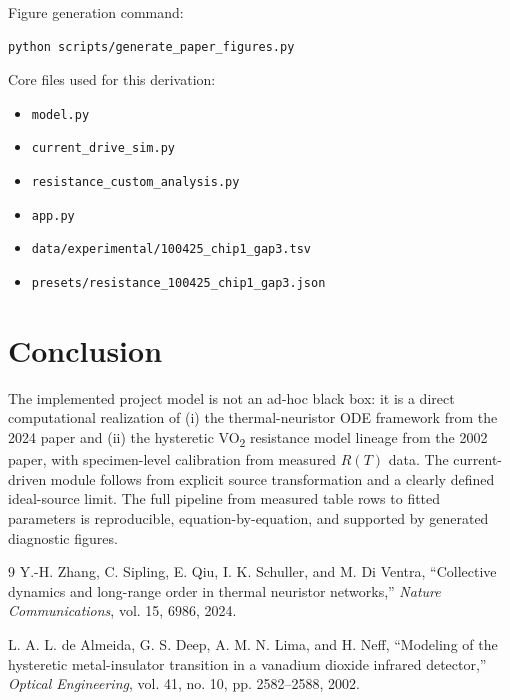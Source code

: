 \documentclass[11pt]{article}
\begin{document}
Figure generation command:
\begin{verbatim}
python scripts/generate_paper_figures.py
\end{verbatim}

Core files used for this derivation:
\begin{itemize}
    \item \texttt{model.py}
    \item \texttt{current\_drive\_sim.py}
    \item \texttt{resistance\_custom\_analysis.py}
    \item \texttt{app.py}
    \item \texttt{data/experimental/100425\_chip1\_gap3.tsv}
    \item \texttt{presets/resistance\_100425\_chip1\_gap3.json}
\end{itemize}

\section{Conclusion}

The implemented project model is not an ad-hoc black box: it is a direct computational realization of (i) the thermal-neuristor ODE framework from the 2024 paper and (ii) the hysteretic VO\textsubscript{2} resistance model lineage from the 2002 paper, with specimen-level calibration from measured \(R(T)\) data. The current-driven module follows from explicit source transformation and a clearly defined ideal-source limit. The full pipeline from measured table rows to fitted parameters is reproducible, equation-by-equation, and supported by generated diagnostic figures.

\begin{thebibliography}{9}
Y.-H. Zhang, C. Sipling, E. Qiu, I. K. Schuller, and M. Di Ventra,
``Collective dynamics and long-range order in thermal neuristor networks,''
\emph{Nature Communications}, vol. 15, 6986, 2024.

L. A. L. de Almeida, G. S. Deep, A. M. N. Lima, and H. Neff,
``Modeling of the hysteretic metal-insulator transition in a vanadium dioxide infrared detector,''
\emph{Optical Engineering}, vol. 41, no. 10, pp. 2582--2588, 2002.
\end{thebibliography}
\end{document}
